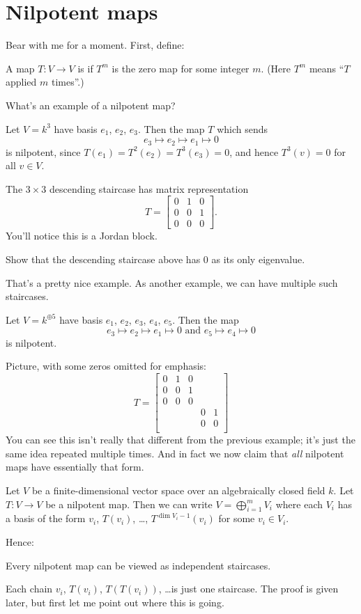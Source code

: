 \section{Nilpotent maps}
Bear with me for a moment.  First, define:
\begin{definition}
	A map $T: V \to V$ is  if $T^m$ is the zero map for some integer $m$.
	(Here $T^m$ means ``$T$ applied $m$ times''.)
\end{definition}
What's an example of a nilpotent map?
\begin{example}
	Let $V = k^3$ have basis $e_1$, $e_2$, $e_3$.
	Then the map $T$ which sends
	\[ e_3 \mapsto e_2 \mapsto e_1 \mapsto 0 \]
	is nilpotent, since $T(e_1) = T^2(e_2) = T^3(e_3) = 0$,
	and hence $T^3(v) = 0$ for all $v \in V$.
\end{example}
The $3 \times 3$ descending staircase has matrix representation
\[ T = \begin{bmatrix}
		0 & 1 & 0 \\
		0 & 0 & 1 \\
		0 & 0 & 0
	\end{bmatrix}. \]
You'll notice this is a Jordan block.
\begin{exercise}
	Show that the descending staircase above
	has $0$ as its only eigenvalue.
\end{exercise}

That's a pretty nice example.
As another example, we can have multiple such staircases.
\begin{example}
	Let $V = k^{\oplus 5}$ have basis $e_1$, $e_2$, $e_3$, $e_4$, $e_5$.
	Then the map 
	\[ e_3 \mapsto e_2 \mapsto e_1 \mapsto 0 \text{ and }
		e_5 \mapsto e_4 \mapsto 0 \]
	is nilpotent.
\end{example}
Picture, with some zeros omitted for emphasis:
\[ T = \begin{bmatrix}
		0 & 1 & 0 &   &   \\
		0 & 0 & 1 &   &   \\
		0 & 0 & 0 &   &   \\
		  &   &   & 0 & 1 \\
		  &   &   & 0 & 0 \\
	\end{bmatrix}
\]
You can see this isn't really that different
from the previous example;
it's just the same idea repeated multiple times.
And in fact we now claim that \emph{all}
nilpotent maps have essentially that form.
\begin{theorem}
	Let $V$ be a finite-dimensional vector space
	over an algebraically closed field $k$.
	Let $T \colon V \to V$ be a nilpotent map.
	Then we can write $V = \bigoplus_{i=1}^m V_i$
	where each $V_i$ has a basis of the form
	$v_i$, $T(v_i)$, \dots, $T^{\dim V_i - 1}(v_i)$
	for some $v_i \in V_i$.
\end{theorem}
Hence:
\begin{moral}
	Every nilpotent map can be viewed as independent staircases.
\end{moral}
Each chain $v_i$, $T(v_i)$, $T(T(v_i))$, \dots is just one staircase.
The proof is given later, but first let me point out where this is going.

